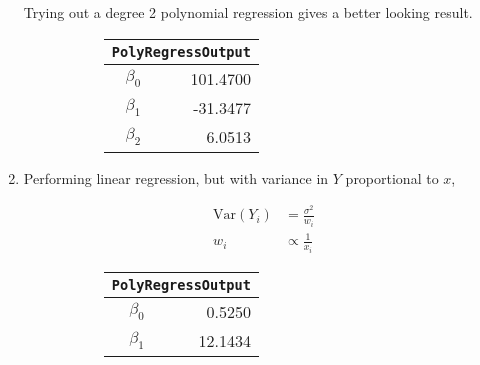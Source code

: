 \begin{enumerate}
Trying out a degree 2 polynomial regression gives a better looking result.

\begin{figure}[H]
	\begin{subfigure}[]{0.2\linewidth}
		\centering
		\begin{tabular}{@{}rr@{}}
			\toprule
			\multicolumn{2}{c}{\texttt{PolyRegressOutput}} \\
			\midrule
			$\beta_0$ &         101.4700 \\
			$\beta_1$ &         -31.3477 \\
			$\beta_2$ &           6.0513 \\
			\bottomrule
		\end{tabular}
		
	\end{subfigure}
	\begin{subfigure}[]{0.8\linewidth}
		\centering
		
	\end{subfigure}
\end{figure}

\item Performing linear regression, but with variance in $ Y $ proportional to $ x $,

\begin{align}
	\mathrm{Var}(Y_i) &= \frac{\sigma^2}{w_i} \nonumber \\
	w_i &\propto \frac{1}{x_i}
\end{align}

\begin{figure}[H]
	\begin{subfigure}[]{0.2\linewidth}
		\centering
		\begin{tabular}{@{}rr@{}}
			\toprule
			\multicolumn{2}{c}{\texttt{PolyRegressOutput}} \\
			\midrule
			$\beta_0$ &           0.5250 \\
			$\beta_1$ &          12.1434 \\
			\bottomrule
		\end{tabular}
		

\end{subfigure}
\end{figure}
\end{enumerate}

